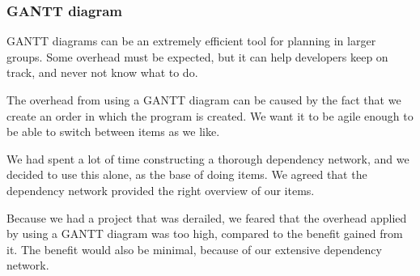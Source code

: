 \subsubsection{GANTT diagram}
GANTT diagrams can be an extremely efficient tool for planning in larger groups. Some overhead must be expected, but it can help developers keep on track, and never not know what to do.

The overhead from using a GANTT diagram can be caused by the fact that we create an order in which the program is created. We want it to be agile enough to be able to switch between items as we like.

We had spent a lot of time constructing a thorough dependency network, and we decided to use this alone, as the base of doing items. We agreed that the dependency network provided the right overview of our items.

Because we had a project that was derailed, we feared that the overhead applied by using a GANTT diagram was too high, compared to the benefit gained from it. The benefit would also be minimal, because of our extensive dependency network.
